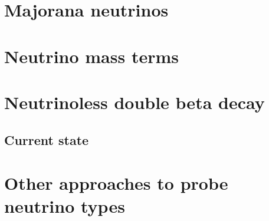 \section{Majorana neutrinos}
\label{sec:major}

\section{Neutrino mass terms}
\label{sec:mass}

\section{Neutrinoless double beta decay}
\label{sec:0n2b}

\subsection{Current state}
\label{sec:state}

\section{Other approaches to probe neutrino types}
\label{sec:others}



